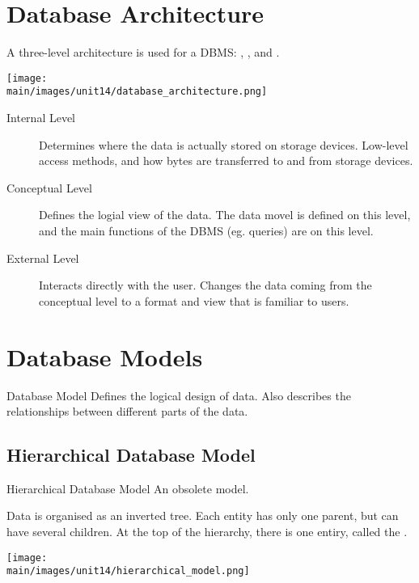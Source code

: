 \documentclass[\main/notes.tex]{subfiles}
\begin{document}
		\section{Database Architecture}
			A three-level architecture is used for a DBMS: , , and .
			\begin{center}
				\texttt{[image: \\main/images/unit14/database\_architecture.png]}
			\end{center}
			\begin{description}
				\item[Internal Level] Determines where the data is actually stored on storage devices. Low-level access methods, and how bytes are transferred to and from storage devices.
				\item[Conceptual Level] Defines the logial view of the data. The data movel is defined on this level, and the main functions of the DBMS (eg. queries) are on this level.
				\item[External Level] Interacts directly with the user. Changes the data coming from the conceptual level to a format and view that is familiar to users.
			\end{description}

		\pagebreak
		\section{Database Models}
			\begin{definition}{Database Model}
				Defines the logical design of data. Also describes the relationships between different parts of the data.
			\end{definition}
			\subsection{Hierarchical Database Model}
				\begin{definition}{Hierarchical Database Model}
					An obsolete model.

					Data is organised as an inverted tree. Each entity has only one parent, but can have several children. At the top of the hierarchy, there is one entiry, called the .

					\begin{center}
						\texttt{[image: \\main/images/unit14/hierarchical\_model.png]}
					\end{center}
				\end{definition}
\end{document}

